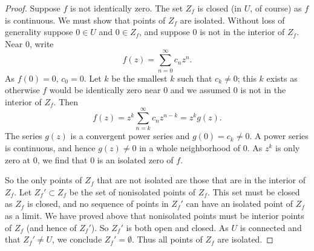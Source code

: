 \documentclass[12pt,openany]{book}
\theoremstyle{plain}
\theoremstyle{remark}
\theoremstyle{definition}
\theoremstyle{exercise}
\theoremstyle{example}
\begin{document}
\begin{proof}
Suppose $f$ is not identically zero.
The set $Z_f$ is closed (in $U$, of course) as $f$ is continuous.  We must show
that points of $Z_f$ are isolated.
Without loss of generality suppose $0 \in U$ and $0 \in Z_f$,
and suppose $0$ is not in the interior of $Z_f$.
Near $0$, write
\begin{equation*}
f(z) = \sum_{n=0}^\infty c_n z^n .
\end{equation*}
As $f(0) = 0$, $c_0 =0$.  Let $k$ be the smallest $k$ such that $c_k \not=0$;
this $k$ exists as otherwise $f$ would be identically zero near $0$
and we assumed $0$ is not in the interior of $Z_f$.  Then
\begin{equation*}
f(z) = z^k \sum_{n=k}^\infty c_n z^{n-k} = z^k g(z) .
\end{equation*}
The series $g(z)$ is a convergent power series and $g(0) = c_k \not=
0$.  A power series is continuous, and hence $g(z) \not= 0$ in a whole
neighborhood of $0$.
As $z^k$ is only zero at $0$, we find that $0$ is an isolated zero of $f$.

So the only points of $Z_f$ that are not isolated are those that are in the
interior of $Z_f$.  Let $Z_f' \subset Z_f$ be the set of nonisolated points
of $Z_f$.  This set must be closed as $Z_f$ is closed, and no sequence
of points in $Z_f'$ can
have an isolated point of $Z_f$ as a limit.
We have proved above that nonisolated
points must be interior points of $Z_f$ (and hence of $Z_f'$).
So $Z_f'$ is both open and closed.  As $U$ is connected and 
that $Z_f' \not= U$, we conclude $Z_f' = \emptyset$.
Thus all points of $Z_f$ are isolated.
\end{proof}
\end{document}
